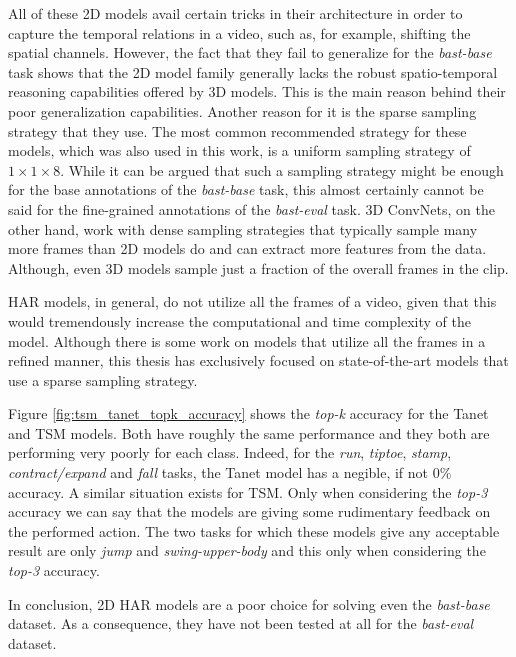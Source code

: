 \documentclass[extern,palatino]{cgMA}
\begin{document}
All of these 2D models avail certain tricks in their architecture in order to capture the temporal relations in a video, such as, for example, shifting the spatial channels. However, the fact that they fail to generalize for the \textit{bast-base} task shows that the 2D model family generally lacks the robust spatio-temporal reasoning capabilities offered by 3D models. This is the main reason behind their poor generalization capabilities. Another reason for it is the sparse sampling strategy that they use. The most common recommended strategy for these models, which was also used in this work, is a uniform sampling strategy of $1 \times 1 \times 8$. While it can be argued that such a sampling strategy might be enough for the base annotations of the \textit{bast-base} task, this almost certainly cannot be said for the fine-grained annotations of the \textit{bast-eval} task. 3D ConvNets, on the other hand, work with dense sampling strategies that typically sample many more frames than 2D models do and can extract more features from the data. Although, even 3D models sample just a fraction of the overall frames in the clip.

HAR models, in general, do not utilize all the frames of a video, given that this would tremendously increase the computational and time complexity of the model. Although there is some work on models that utilize all the frames \cite{liu2021no} in a refined manner, this thesis has exclusively focused on state-of-the-art models that use a sparse sampling strategy.

\bigskip
\noindent Figure \ref{fig:tsm_tanet_topk_accuracy} shows the \textit{top-k} accuracy for the Tanet and TSM models. Both have roughly the same performance and they both are performing very poorly for each class. Indeed, for the \textit{run}, \textit{tiptoe}, \textit{stamp}, \textit{contract/expand} and \textit{fall} tasks, the Tanet model has a negible, if not $0\%$ accuracy. A similar situation exists for TSM. Only when considering the \textit{top-3} accuracy we can say that the models are giving some rudimentary feedback on the performed action. The two tasks for which these models give any acceptable result are only \textit{jump} and \textit{swing-upper-body} and this only when considering the \textit{top-3} accuracy.

\noindent In conclusion, 2D HAR models are a poor choice for solving even the \textit{bast-base} dataset. As a consequence, they have not been tested at all for the \textit{bast-eval} dataset.
\end{document}
